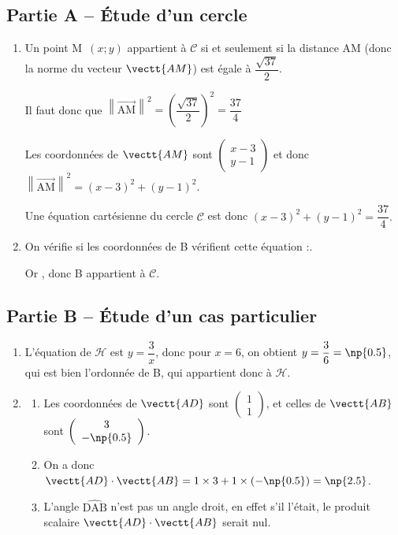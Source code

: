 \subsection*{Partie A -- Étude d'un cercle}
	\begin{enumerate}
		\item Un point {M~$(x;y)$} appartient à $\mathcal{C}$ si et seulement si la distance AM (donc la norme du vecteur $\vectt{AM}$) est égale à {$\dfrac{\sqrt{37}}{2}$.}

		Il faut donc que {$\left\|\overrightarrow{\text{AM}}\right\|^2=\left(\dfrac{\sqrt{37}}{2}\right)^2=\dfrac{37}{4}$}

		Les coordonnées de {$\vectt{AM}$} sont {$\left(\begin{array}{c}x-3\\ y-1\end{array}\right)$} et donc {$\left\|\overrightarrow{\text{AM}}\right\|^2=(x-3)^2+(y-1)^2$.}

		Une équation cartésienne du cercle {$\mathcal{C}$} est donc {$(x-3)^2+(y-1)^2=\dfrac{37}{4}$.}

		\item On vérifie si les coordonnées de B vérifient cette équation :.

		Or , \quad donc B appartient à {$\mathcal{C}$.}
	\end{enumerate}

\subsection*{Partie B -- Étude d'un cas particulier}

	\begin{enumerate}
		\item L'équation de {$\mathcal{H}$} est {$y=\dfrac 3 x$}, donc pour {$x=6$}, on obtient {$y=\dfrac 3 6=\np{0.5}$}, qui est bien l'ordonnée de B, qui appartient donc à {$\mathcal{H}$.}

		\item \begin{enumerate}
			\item Les coordonnées de {$\vectt{AD}$} sont {$\left(\begin{array}{c}1\\ 1\end{array}\right)$}, et celles de {$\vectt{AB}$} sont {$\left(\begin{array}{c}3\\ -\np{0.5}\end{array}\right)$.}

			\item On a donc {$\vectt{AD}\cdot\vectt{AB}=1\times3+1\times(-\np{0.5})=\np{2.5}$.}

			\item L'angle  $\widehat{\text{DAB}}$ n'est pas un angle droit, en effet s'il l'était, le produit scalaire {$\vectt{AD}\cdot\vectt{AB}$} serait nul.
		\end{enumerate}
	\end{enumerate}

